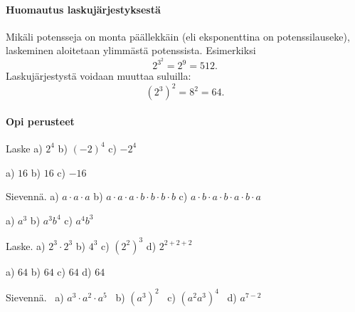 \paragraph*{Huomautus laskujärjestyksestä}

Mikäli potensseja on monta päällekkäin (eli eksponenttina on potenssilauseke),
laskeminen aloitetaan ylimmästä potenssista. Esimerkiksi
\[2^{3^2}= 2^9 = 512. \]
Laskujärjestystä voidaan muuttaa suluilla:
\[(2^3)^2=8^2=64. \]

\begin{tehtavasivu}

\paragraph*{Opi perusteet}

    \begin{tehtava}
        Laske
        a) $2^4$ \quad
        b) $(-2)^4$ \quad
        c) $-2^4$

        \begin{vastaus}
            a) $ 16$ \quad
            b) $16$ \quad 
            c) $-16$
        \end{vastaus}
    \end{tehtava}

    \begin{tehtava}
        Sievennä. \quad
        a) $a\cdot a\cdot a$ \quad
        b) $a\cdot a\cdot a\cdot b\cdot b\cdot b\cdot b$ \quad
        c) $a\cdot b\cdot a\cdot b\cdot a\cdot b\cdot a$
        
        \begin{vastaus}
            a) $a^3$ \qquad
            b) $a^3b^4$ \qquad
            c) $a^4b^3$
        \end{vastaus}
    \end{tehtava}


    \begin{tehtava}
        Laske. \quad
        a) $2^3\cdot2^3$ \qquad
        b) $4^3$ \qquad
        c) $(2^2)^3$ \qquad
        d) $2^{2+2+2}$

        \begin{vastaus}
            a) $64$ \qquad
            b) $64$ \qquad
            c) $64$ \qquad
            d) $64$
        \end{vastaus}
    \end{tehtava}

\begin{tehtava}
        Sievennä. \quad \
        a) $a^3\cdot a^2\cdot a^5$ \quad \
        b) $(a^3)^2$ \quad \
        c) $(a^2a^3)^4$ \quad \
        d) $a^{7-2}$


\end{tehtava}
\end{tehtavasivu}

